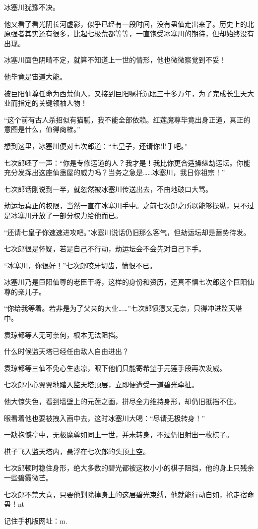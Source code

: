 \begin{this_body}
冰塞川犹豫不决。

他又看了看光阴长河虚影，似乎已经有一段时间，没有蛊仙走出来了。历史上的北原强者其实还有很多，比起七极荒都等等，一直饱受冰塞川的期待，但却始终没有出现。

冰塞川面色阴晴不定，就算不知道上一世的情形，他也微微察觉到不妥！

他毕竟是宙道大能。

被巨阳仙尊任命为西荒仙人，又接到巨阳嘱托沉眠三十多万年，为了完成长生天大业而指定的关键领袖人物！

“这个前有古人杀招似有猫腻，我不能全部依赖。红莲魔尊毕竟出身正道，真正的意图是什么，值得商榷。”

想到这里，冰塞川便对七次郎道：“七皇子，还请你出手吧。”

七次郎呸了一声：“你是专修运道的人？我才是！我比你更合适操纵劫运坛。你能充分发挥出这座仙蛊屋的威力吗？当务之急是……冰塞川，我日你祖宗！”

七次郎话刚说到一半，就忽然被冰塞川传送出去，不由地破口大骂。

劫运坛真正的权限，当然一直在冰塞川手中。之前七次郎之所以能够操纵，只不过是冰塞川开放了一部分权力给他而已。

“还请七皇子你速速进攻吧。”冰塞川说话仍旧那么客气，但劫运坛却是蓄势待发。

七次郎很是怀疑，若是自己不行动，劫运坛会不会先对自己下手。

“冰塞川，你很好！”七次郎咬牙切齿，愤恨不已。

冰塞川乃是巨阳仙尊的老臣干将，这样的身份和资历，还真不惧七次郎这个巨阳仙尊的亲儿子。

“你给我等着。若非是为了父亲的大业……”七次郎愤懑又无奈，只得冲进监天塔中。

袁琼都等人无可奈何，根本无法阻挡。

什么时候监天塔已经任由敌人自由进出？

袁琼都等三仙不免心生悲凉，眼下他们只能寄希望于元莲手段再次发威。

七次郎小心翼翼地踏入监天塔顶层，立即便遭受一道碧光牵扯。

他大惊失色，看到墙壁上的元莲之画，拼尽全力维持身形，却仍旧抵挡不住。

眼看着他也要被拽入画中去，这时冰塞川大喝：“尽请无极转身！”

一缺抱憾亭中，无极魔尊如同上一世，并未转身，不过仍旧射出一枚棋子。

棋子飞入监天塔内，悬浮在七次郎的头顶上空。

七次郎顿时稳住身形，绝大多数的碧光都被这枚小小的棋子阻挡，他的身上只残余一些碧霞微芒。

七次郎不禁大喜，只要他剿除掉身上的这层碧光束缚，他就能行动自如，抢走宿命蛊！nt

记住手机版网址：m.

\end{this_body}

